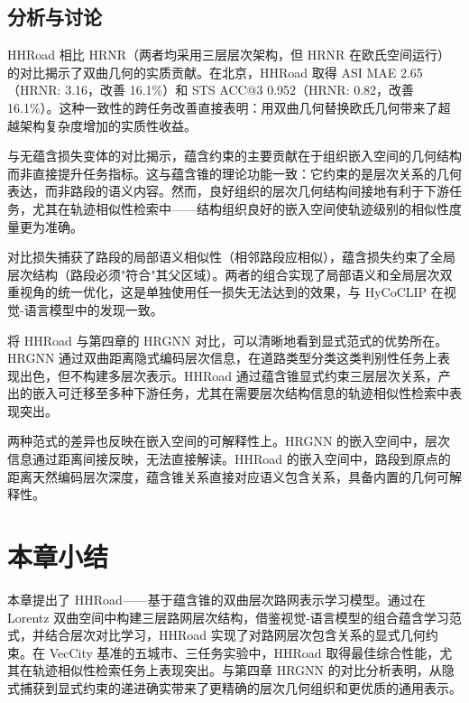 \subsection{分析与讨论}

HHRoad 相比 HRNR（两者均采用三层层次架构，但 HRNR 在欧氏空间运行）的对比揭示了双曲几何的实质贡献。在北京，HHRoad 取得 ASI MAE 2.65（HRNR: 3.16，改善 16.1\%）和 STS ACC@3 0.952（HRNR: 0.82，改善 16.1\%）。这种一致性的跨任务改善直接表明：用双曲几何替换欧氏几何带来了超越架构复杂度增加的实质性收益。

与无蕴含损失变体的对比揭示，蕴含约束的主要贡献在于组织嵌入空间的几何结构而非直接提升任务指标。这与蕴含锥的理论功能一致：它约束的是层次关系的几何表达，而非路段的语义内容。然而，良好组织的层次几何结构间接地有利于下游任务，尤其在轨迹相似性检索中——结构组织良好的嵌入空间使轨迹级别的相似性度量更为准确。

对比损失捕获了路段的局部语义相似性（相邻路段应相似），蕴含损失约束了全局层次结构（路段必须"符合"其父区域）。两者的组合实现了局部语义和全局层次双重视角的统一优化，这是单独使用任一损失无法达到的效果，与 HyCoCLIP 在视觉-语言模型中的发现一致。

将 HHRoad 与第四章的 HRGNN 对比，可以清晰地看到显式范式的优势所在。HRGNN 通过双曲距离隐式编码层次信息，在道路类型分类这类判别性任务上表现出色，但不构建多层次表示。HHRoad 通过蕴含锥显式约束三层层次关系，产出的嵌入可迁移至多种下游任务，尤其在需要层次结构信息的轨迹相似性检索中表现突出。

两种范式的差异也反映在嵌入空间的可解释性上。HRGNN 的嵌入空间中，层次信息通过距离间接反映，无法直接解读。HHRoad 的嵌入空间中，路段到原点的距离天然编码层次深度，蕴含锥关系直接对应语义包含关系，具备内置的几何可解释性。

\section{本章小结}

本章提出了 HHRoad——基于蕴含锥的双曲层次路网表示学习模型。通过在 Lorentz 双曲空间中构建三层路网层次结构，借鉴视觉-语言模型的组合蕴含学习范式，并结合层次对比学习，HHRoad 实现了对路网层次包含关系的显式几何约束。在 VecCity 基准的五城市、三任务实验中，HHRoad 取得最佳综合性能，尤其在轨迹相似性检索任务上表现突出。与第四章 HRGNN 的对比分析表明，从隐式捕获到显式约束的递进确实带来了更精确的层次几何组织和更优质的通用表示。